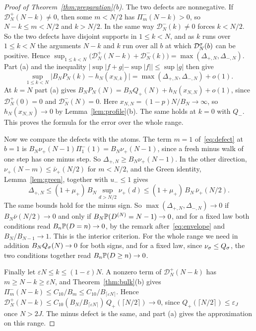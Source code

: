 \begin{proof}[Proof of Theorem~\ref{thm:preparation}(b)]
The two defects are nonnegative. If $\mathcal D^\plus_N(N-k)\ne0$, then some $m<N/2$ has
$\Pi^\minus_m(N-k)>0$, so $N-k\le m<N/2$ and $k>N/2$. In the same way
$\mathcal D^\minus_N(k)\ne0$ forces $k<N/2$. So the two defects have disjoint supports
in $1\le k<N$, and as $k$ runs over $1\le k<N$ the arguments $N-k$ and $k$ run over
all $b$ at which $\mathcal D^\sigma_N(b)$ can be positive. Hence
$\sup_{1\le k<N}\bigl(\mathcal D^\plus_N(N-k)+\mathcal D^\minus_N(k)\bigr)=\max(\Delta_{\plus,N},\Delta_{\minus,N})$.
Part (a) and the inequality $|\sup|f+g|-\sup|f||\le\sup|g|$ then give
\[
 \sup_{1\le k<N}\bigl|B_NP_N(k)-h_N(x_{N,k})\bigr|=\max(\Delta_{\plus,N},\Delta_{\minus,N})+o(1).
\]
At $k=N$ part (a) gives $B_NP_N(N)=B_NQ_\plus(N)+h_N(x_{N,N})+o(1)$, since
$\mathcal D^\plus_N(0)=0$ and $\mathcal D^\minus_N(N)=0$. Here $x_{N,N}=(1-p)N/B_N\to\infty$,
so $h_N(x_{N,N})\to0$ by Lemma~\ref{lem:profile}(b). The same holds at $k=0$ with
$Q_\minus$. This proves the formula for the error over the whole range.

Now we compare the defects with the atoms. The term $m=1$ of~\eqref{eq:defect} at
$b=1$ is $B_N\nu_\plus(N-1)\Pi^\minus_1(1)=B_N\nu_\plus(N-1)$, since a fresh minus walk
of one step has one minus step. So $\Delta_{\plus,N}\ge B_N\nu_\plus(N-1)$. In the
other direction, $\nu_\plus(N-m)\le\bar\nu_\plus(N/2)$ for $m<N/2$, and the Green
identity, Lemma~\ref{lem:green}, together with $u_\minus\le1$ gives
\begin{equation}\label{eq:defect-upper}
 \Delta_{\plus,N}\le(1+\mu_\plus)\,B_N\sup_{d>N/2}\nu_\plus(d)\le(1+\mu_\plus)\,B_N\,\bar\nu_\plus(N/2).
\end{equation}
The same bounds hold for the minus sign. So $\max(\Delta_{\plus,N},\Delta_{\minus,N})\to0$ if
$B_N\bar\nu(N/2)\to0$ and only if $B_N\mathbb{P}(D^{(N)}=N-1)\to0$, and for a fixed law both
conditions read $B_n\mathbb{P}(D=n)\to0$, by the remark after~\eqref{eq:envelope} and
$B_N/B_{N-1}\to1$. This is the interior criterion. For the whole range we need in
addition $B_NQ_\sigma(N)\to0$ for both signs, and for a fixed law, since $\nu_\sigma\le Q_\sigma$,
the two conditions together read $B_n\mathbb{P}(D\ge n)\to0$.

Finally let $\varepsilon N\le k\le(1-\varepsilon)N$. A nonzero term of
$\mathcal D^\plus_N(N-k)$ has $m\ge N-k\ge\varepsilon N$, and Theorem~\ref{thm:bulk}(b)
gives $\Pi^\minus_m(N-k)\le C_{10}/B_m\le C_{10}/B_{\lceil\varepsilon N\rceil}$. Hence
$\mathcal D^\plus_N(N-k)\le C_{10}(B_N/B_{\lceil\varepsilon N\rceil})\,Q_\plus(\lceil N/2\rceil)\to0$,
since $Q_\plus(\lceil N/2\rceil)\le\varepsilon_J$ once $N>2J$. The minus defect is the same, and part (a)
gives the approximation on this range.
\end{proof}

